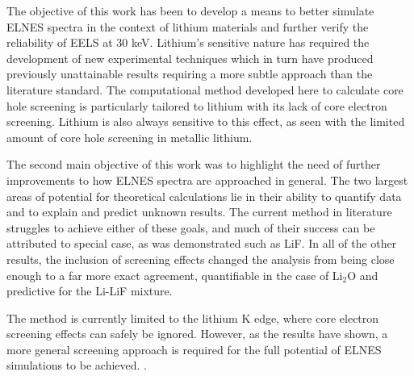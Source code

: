 
The objective of this work has been to develop a means to better simulate ELNES spectra in the context of lithium materials and further verify the reliability of EELS at 30 keV.  Lithium's sensitive nature has required the development of new experimental techniques which in turn have produced previously unattainable results requiring a more subtle approach than the literature standard.  The computational method developed here to calculate core hole screening is particularly tailored to lithium with its lack of core electron screening.  Lithium is also always sensitive to this effect, as seen with the limited amount of core hole screening in metallic lithium.  

The second main objective of this work was to highlight the need of further improvements to how ELNES spectra are approached in general.  The two largest areas of potential for theoretical calculations lie in their ability to quantify data and to explain and predict unknown results.  The current method in literature struggles to achieve either of these goals, and much of their success can be attributed to special case, as was demonstrated such as LiF.  In all of the other results, the inclusion of screening effects changed the analysis from being close enough to a far more exact agreement, quantifiable in the case of $ \mathrm{Li_2O}$ and predictive for the Li-LiF mixture.  

The method is currently limited to the lithium K edge, where core electron screening effects can safely be ignored.  However, as the results have shown, a more general screening approach is required for the full potential of ELNES simulations to be achieved.  .
